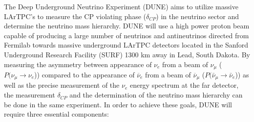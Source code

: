 \label{sec:IF_LBNProgram}
The Deep Underground Neutrino Experiment (DUNE) \cite{DUNE} aims to utilize massive LArTPC's to measure the CP violating phase ($\delta_{CP}$) in the neutrino sector and determine the neutrino mass hierarchy. DUNE will use a high power proton beam capable of producing a large number of neutrinos and antineutrinos directed from Fermilab towards massive underground LArTPC detectors located in the Sanford Underground Research Facility (SURF) 1300 km away in Lead, South Dakota. By measuring the asymmetry between appearance of $\nu_{e}$ from a beam of $\nu_{\mu}$ ($P(\nu_{\mu} \rightarrow \nu_{e}$)) compared to the appearance of $\overline{\nu}_{e}$ from a beam of $\overline{\nu}_{\mu}$ ($P(\bar{\nu}_{\mu} \rightarrow \bar{\nu}_{e}$)) as well as the precise measurement of the $\nu_{e}$ energy spectrum at the far detector, the measurement $\delta_{CP}$ and the determination of the neutrino mass hierarchy can be done in the same experiment. In order to achieve these goals, DUNE will require three essential components:
